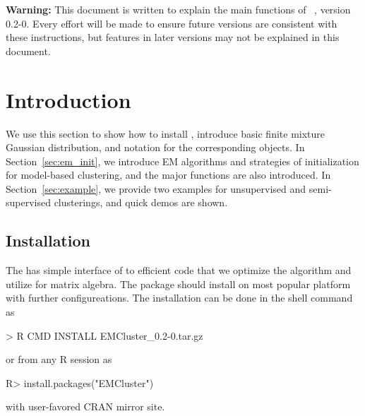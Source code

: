 
{\color{red} \bf Warning:} This document is written to explain the main
functions of ~\citep{Chen2012EMClusterpackage}, version 0.2-0.
Every effort will be made to ensure future versions are consistent with
these instructions, but features in later versions may not be explained
in this document.


\section[Introduction]{Introduction}
\label{sec:introduction}

We use this section to show how to install ,
introduce basic finite mixture Gaussian distribution,
and notation for the corresponding  objects.
In Section~\ref{sec:em_init}, we introduce EM algorithms and
strategies of initialization for model-based clustering, and
the major  functions are also introduced.
In Section~\ref{sec:example}, we provide two
examples for unsupervised and semi-supervised clusterings,
and quick demos are shown.


\subsection[Installation]{Installation}
The  has simple interface of  to efficient
 code that we optimize the algorithm and utilize 
for matrix algebra. The package should install on most popular platform with
further configureations. The installation can be done in the shell command
as
\begin{Command}
> R CMD INSTALL EMCluster_0.2-0.tar.gz
\end{Command}
or from any R session as
\begin{Command}
R> install.packages("EMCluster") 
\end{Command}
with user-favored CRAN mirror site.


